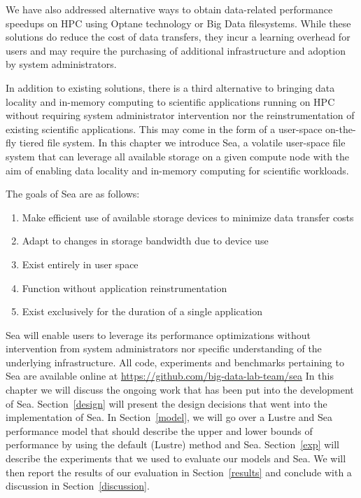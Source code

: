 \documentclass{report}
\begin{document}
    We have also addressed alternative ways to obtain data-related performance speedups on HPC
    using Optane technology or Big Data filesystems. While these solutions do reduce the cost of data transfers, they incur
    a learning overhead for users and may require the purchasing of additional infrastructure and
    adoption by system administrators.

    In addition to existing solutions, there is a third alternative to bringing data
    locality and in-memory computing to scientific applications running on HPC
    without requiring system administrator intervention nor the reinstrumentation
    of existing scientific applications. This may come in the form of a user-space 
    on-the-fly tiered file system. In this chapter we introduce Sea, a volatile user-space file
    system that can leverage all available storage on a given compute node with the aim
    of enabling data locality and in-memory computing for scientific workloads.

    The goals of Sea are as follows:
    \begin{enumerate}
            \item Make efficient use of available storage devices to minimize data
                transfer costs
            \item Adapt to changes in storage bandwidth due to device use
            \item Exist entirely in user space
            \item Function without application reinstrumentation
            \item Exist exclusively for the duration of a single application
    \end{enumerate}

   Sea will enable users to leverage its performance optimizations without intervention
   from system administrators nor specific understanding of the underlying infrastructure.
   All code, experiments and benchmarks pertaining to Sea are available online at
   \href{https://github.com/big-data-lab-team/sea}{https://github.com/big-data-lab-team/sea}
   In this chapter we will discuss the ongoing work that has been put into the development
   of Sea. Section~\ref{design} will present the design decisions that went into the
   implementation of Sea. In Section~\ref{model}, we will go over a Lustre and Sea
   performance model that should describe the upper and lower bounds of performance by using
   the default (Lustre) method and Sea. Section~\ref{exp} will describe the experiments that we
   used to evaluate our models and Sea. We will then report the results of our evaluation
   in Section~\ref{results} and conclude with a discussion in Section~\ref{discussion}.
    
\end{document}
